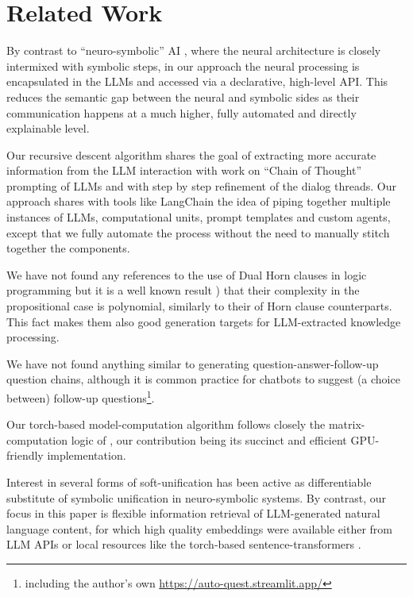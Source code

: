 \section{Related Work}
\label{rel}


By contrast to ``neuro-symbolic'' AI \cite{neurosym}, where the neural architecture is closely intermixed with symbolic steps, in our approach the neural processing is encapsulated in the LLMs and accessed via a declarative, high-level API. This reduces the semantic gap between the neural and symbolic sides as their communication happens at a much higher, fully automated and directly explainable level.


Our recursive descent algorithm shares the goal of extracting more accurate information from the LLM interaction with work on ``Chain of Thought'' prompting of LLMs \cite{chainofthought,ling2023deductive} and with step by step \cite{lightman2023lets} refinement of the dialog threads. 
Our approach shares with tools like LangChain \cite{langchain} the idea of piping together multiple instances of LLMs, computational units, prompt templates and custom agents, except that we fully automate the process without the need to manually stitch together the components.

We have not found any references to the use of Dual Horn clauses in logic programming but it is a well known result \cite{schaefer78}) that their complexity in the propositional case is polynomial, similarly to their of Horn clause counterparts. This fact makes them also good generation targets for LLM-extracted knowledge processing. 

We have not found anything similar to generating question-answer-follow-up question chains, although it is common practice for chatbots to  suggest (a choice between) follow-up questions\footnote{ including the author's own \url{https://auto-quest.streamlit.app/}}.

Our torch-based model-computation algorithm follows closely the matrix-computation logic of \cite{linalg_lp}, our contribution being its succinct and efficient GPU-friendly implementation.

Interest in several forms of soft-unification has been active  \cite{soft_unif,ltn22,deepsoftlog23} as differentiable substitute of symbolic unification in neuro-symbolic systems.
By contrast, our focus in this paper is flexible information retrieval of LLM-generated natural language content, for which high quality embeddings were available either from LLM APIs or local resources like the torch-based sentence-transformers \cite{sbert}.